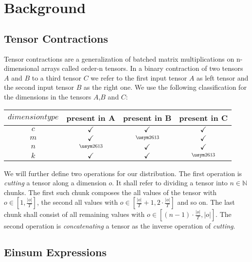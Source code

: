 \section{Background}

\subsection{Tensor Contractions}
\label{sec:tensorContractions}

Tensor contractions are a generalization of batched matrix multiplications on n-dimensional arrays called order-n tensors.
In a binary contraction of two tensors $A$ and $B$ to a third tensor $C$ we refer to the first input tensor $A$ as left tensor and the second input tensor $B$ as the right one. %
We use the following classification for the dimensions in the tensors $A$,$B$ and $C$:

\begin{tabular}{ |c|c|c|c| } 
  \hline
  $dimension type$ & present in A & present in B & present in C\\
  \hline
  $c$ & $\checkmark$& $\checkmark$& $\checkmark$\\
  $m$ & $\checkmark$& $\crossmark$& $\checkmark$\\
  $n$ & $\crossmark$& $\checkmark$& $\checkmark$\\
  $k$ & $\checkmark$& $\checkmark$& $\crossmark$\\
  \hline
\end{tabular}

We will further define two operations for our distribution.
The first operation is \textit{cutting} a tensor along a dimension $o$.
It shall refer to dividing a tensor into $n \in \mathbb{N}$ chunks.
The first such chunk composes the all values of the tensor with $o \in [1,\frac{|o|}{T}]$, the second all values with $o \in [\frac{|o|}{T}+1, 2 \cdot \frac{|o|}{T}]$ and so on.
The last chunk shall consist of all remaining values with $o \in [(n-1) \cdot \frac{|o|}{T}, |o|]$.
The second operation is \textit{concatenating} a tensor as the inverse operation of \textit{cutting}.


\subsection{Einsum Expressions}
\label{sec:einsum_expr}

